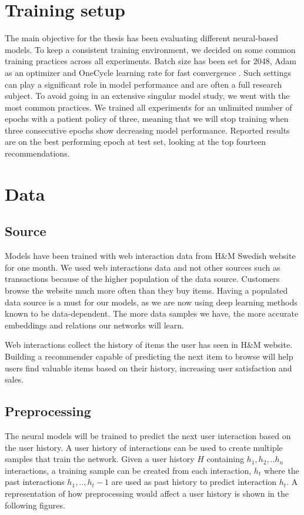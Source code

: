 \documentclass{kththesis}
\begin{document}
\section{Training setup}
The main objective for the thesis has been evaluating different neural-based models. To keep a consistent training environment, we decided on some common training practices across all experiments. Batch size has been set for 2048, Adam \cite{adam} as an optimizer and OneCycle learning rate for fast convergence \cite{onecycle}. Such settings can play a significant role in model performance and are often a full research subject. To avoid going in an extensive singular model study, we went with the most common practices. We trained all experiments for an unlimited number of epochs with a patient policy of three, meaning that we will stop training when three consecutive epochs show decreasing model performance. Reported results are on the best performing epoch at test set, looking at the top fourteen recommendations.

\section{Data}
\subsection{Source}
Models have been trained with web interaction data from H\&M Swedish website for one month. We used web interactions data and not other sources such as transactions because of the higher population of the data source. Customers browse the website much more often than they buy items. Having a populated data source is a must for our models, as we are now using deep learning methods known to be data-dependent. The more data samples we have, the more accurate embeddings and relations our networks will learn. 

Web interactions collect the history of items the user has seen in H\&M website. Building a recommender capable of predicting the next item to browse will help users find valuable items based on their history, increasing user satisfaction and sales.

\subsection{Preprocessing}
The neural models will be trained to predict the next user interaction based on the user history. A user history of interactions can be used to create multiple samples that train the network. Given a user history $H$ containing $h_1, h_2, .. h_n$ interactions, a training sample can be created from each interaction, $h_t$ where the past interactions $h_1, .., h_t-1$ are used as past history to predict interaction $h_t$. A representation of how preprocessing would affect a user history is shown in the following figures.
\end{document}
